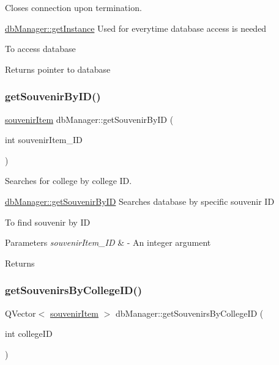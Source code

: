 Closes connection upon termination. 

\mbox{\hyperlink{classdb_manager_a0b96aeab4f66563db74711be1dfc1edb}{db\+Manager\+::get\+Instance}} Used for everytime database access is needed

To access database \begin{DoxyReturn}{Returns}
pointer to database 
\end{DoxyReturn}
\mbox{\label{classdb_manager_a005ba0700501bd4c601a79248607f2b6}} 
\subsubsection{\texorpdfstring{get\+Souvenir\+By\+I\+D()}{getSouvenirByID()}}
{\footnotesize\ttfamily \mbox{\hyperlink{structsouvenir_item}{souvenir\+Item}} db\+Manager\+::get\+Souvenir\+By\+ID (\begin{DoxyParamCaption}\item[{int}]{souvenir\+Item\+\_\+\+ID }\end{DoxyParamCaption})}



Searches for college by college ID. 

\mbox{\hyperlink{classdb_manager_a005ba0700501bd4c601a79248607f2b6}{db\+Manager\+::get\+Souvenir\+By\+ID}} Searches database by specific souvenir ID

To find souvenir by ID 
\begin{DoxyParams}{Parameters}
{\em souvenir\+Item\+\_\+\+ID} & -\/ An integer argument \\
\hline
\end{DoxyParams}
\begin{DoxyReturn}{Returns}

\end{DoxyReturn}
\mbox{\label{classdb_manager_a91281dfbeb41cebfa8a633e3a7e12a5e}} 
\subsubsection{\texorpdfstring{get\+Souvenirs\+By\+College\+I\+D()}{getSouvenirsByCollegeID()}}
{\footnotesize\ttfamily Q\+Vector$<$ \mbox{\hyperlink{structsouvenir_item}{souvenir\+Item}} $>$ db\+Manager\+::get\+Souvenirs\+By\+College\+ID (\begin{DoxyParamCaption}\item[{int}]{college\+ID }\end{DoxyParamCaption})}



